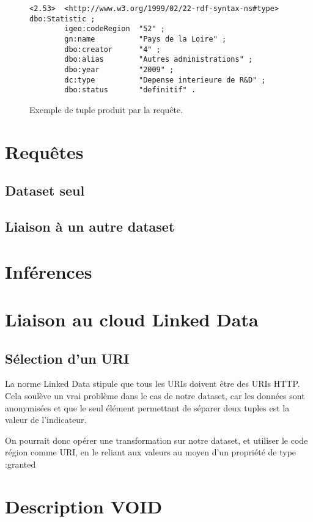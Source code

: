 \begin{figure}[b]
\begin{lstlisting}
<2.53>  <http://www.w3.org/1999/02/22-rdf-syntax-ns#type>  dbo:Statistic ;
        igeo:codeRegion  "52" ;
        gn:name          "Pays de la Loire" ;
        dbo:creator      "4" ;
        dbo:alias        "Autres administrations" ;
        dbo:year         "2009" ;
        dc:type          "Depense interieure de R&D" ;
        dbo:status       "definitif" .
\end{lstlisting}
\caption{Exemple de tuple produit par la requête.}
\end{figure}


\chapter{Requêtes}
\section{Dataset seul}

\section{Liaison à un autre dataset}


\chapter{Inférences}


\chapter{Liaison au cloud Linked Data}
\section{Sélection d'un URI}

La norme Linked Data stipule que tous les URIs doivent être des URIs HTTP. Cela soulève un vrai problème dans le cas de notre dataset, car les données sont anonymisées et que le seul élément permettant de séparer deux tuples est la valeur de l'indicateur.

On pourrait donc opérer une transformation sur notre dataset, et utiliser le code région comme URI, en le reliant aux valeurs au moyen d'un propriété de type :granted

\chapter{Description VOID}
